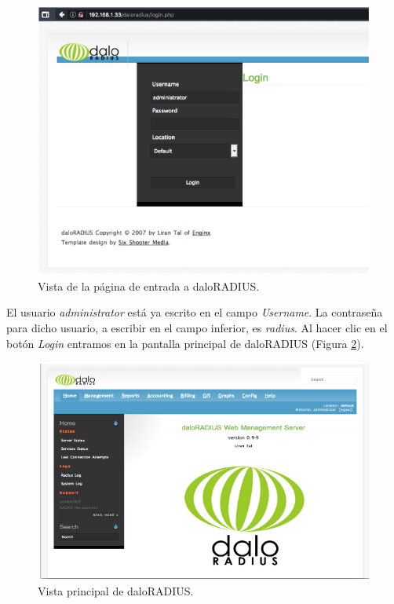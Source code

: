 \begin{figure}[!t]
\begin{center}
\includegraphics[width=0.75\linewidth]{./5_AnalisisOrganico/Img/daloLogin.png}
\end{center}
\caption{Vista de la página de entrada a daloRADIUS.}
\label{daloLogin}
\end{figure}

El usuario \emph{administrator} está ya escrito en el campo \emph{Username}. La contraseña para dicho usuario, a escribir en el campo inferior, es \emph{radius}. Al hacer clic en el botón \emph{Login} entramos en la pantalla principal de daloRADIUS (Figura \ref{daloMain}).

\begin{figure}[!t]
\begin{center}
\includegraphics[width=0.75\linewidth]{./5_AnalisisOrganico/Img/daloMain.png}
\end{center}
\caption{Vista principal de daloRADIUS.}
\label{daloMain}
\end{figure}

